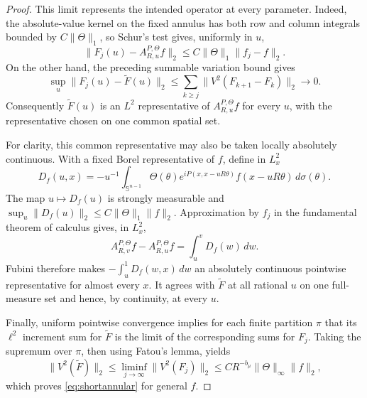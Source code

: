 \documentclass[11pt]{article}
\numberwithin{equation}{section}
\theoremstyle{remark}
\theoremstyle{definition}
\newcommand{\Sph}{\mathbb S}
\newcommand{\norm}[1]{\lVert #1\rVert}
\begin{document}
\begin{proof}
This limit represents the intended operator at every parameter.  Indeed,
the absolute-value kernel on the fixed annulus has both row and column
integrals bounded by $C\norm\Theta_1$, so Schur's test gives, uniformly in
$u$,
\[
 \norm{F_j(u)-A^{P,\Theta}_{R,u}f}_2
 \le C\norm\Theta_1\norm{f_j-f}_2.
\]
On the other hand, the preceding summable variation bound gives
\[
 \sup_{u}\norm{F_j(u)-\widetilde F(u)}_2
 \le\sum_{k\ge j}\norm{V^2(F_{k+1}-F_k)}_2\longrightarrow0.
\]
Consequently $\widetilde F(u)$ is an $L^2$ representative of
$A^{P,\Theta}_{R,u}f$ for every $u$, with the representative chosen on one
common spatial set.

For clarity, this common representative may also be taken locally
absolutely continuous.  With a fixed Borel representative of $f$, define
in $L^2_x$
\[
 D_f(u,x)=-u^{-1}\int_{\Sph^{n-1}}\Theta(\theta)
 e^{iP(x,x-uR\theta)}f(x-uR\theta)\,d\sigma(\theta).
\]
The map $u\mapsto D_f(u)$ is strongly measurable and
$\sup_u\norm{D_f(u)}_2\le C\norm\Theta_1\norm f_2$.  Approximation by
$f_j$ in the fundamental theorem of calculus gives, in $L^2_x$,
\[
 A^{P,\Theta}_{R,v}f-A^{P,\Theta}_{R,u}f
   =\int_u^vD_f(w)\,dw.
\]
Fubini therefore makes $-\int_u^1D_f(w,x)\,dw$ an absolutely continuous
pointwise representative for almost every $x$.  It agrees with
$\widetilde F$ at all rational $u$ on one full-measure set and hence, by
continuity, at every $u$.

Finally, uniform pointwise convergence implies for each finite partition
$\pi$ that its $\ell^2$ increment sum for $\widetilde F$ is the limit of
the corresponding sums for $F_j$.  Taking the supremum over $\pi$, then
using Fatou's lemma, yields
\[
 \norm{V^2(\widetilde F)}_2
 \le\liminf_{j\to\infty}\norm{V^2(F_j)}_2
 \le C R^{-b_\mu}\norm\Theta_\infty\norm f_2,
\]
which proves \eqref{eq:shortannular} for general $f$.
\end{proof}
\end{document}
